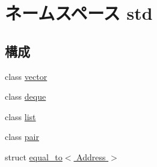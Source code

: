 \hypertarget{namespacestd}{
\section{ネームスペース std}
\label{namespacestd}
}
\subsection*{構成}
\begin{DoxyCompactItemize}
\item 
class \hyperlink{classstd_1_1vector}{vector}
\item 
class \hyperlink{classstd_1_1deque}{deque}
\item 
class \hyperlink{classstd_1_1list}{list}
\item 
class \hyperlink{classstd_1_1pair}{pair}
\item 
struct \hyperlink{structstd_1_1equal__to_3_01Address_01_4}{equal\_\-to$<$ Address $>$}
\end{DoxyCompactItemize}
